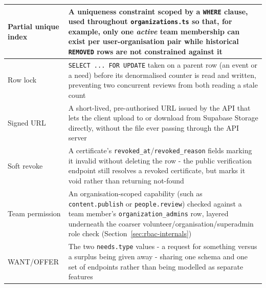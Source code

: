 \begin{longtable}{|p{}|>{\raggedright\arraybackslash}p{}|}
Partial unique index & A uniqueness constraint scoped by a \texttt{WHERE} clause, used throughout \texttt{organizations.ts} so that, for example, only one \emph{active} team membership can exist per user-organisation pair while historical \texttt{REMOVED} rows are not constrained against it\\\hline
Row lock & \texttt{SELECT ... FOR UPDATE} taken on a parent row (an event or a need) before its denormalised counter is read and written, preventing two concurrent reviews from both reading a stale count\\\hline
Signed URL & A short-lived, pre-authorised URL issued by the API that lets the client upload to or download from Supabase Storage directly, without the file ever passing through the API server\\\hline
Soft revoke & A certificate's \texttt{revoked\_at}/\texttt{revoked\_reason} fields marking it invalid without deleting the row - the public verification endpoint still resolves a revoked certificate, but marks it void rather than returning not-found\\\hline
Team permission & An organisation-scoped capability (such as \texttt{content.publish} or \texttt{people.review}) checked against a team member's \texttt{organization\_admins} row, layered underneath the coarser volunteer/organisation/superadmin role check (Section~\ref{sec:rbac-internals})\\\hline
WANT/OFFER & The two \texttt{needs.type} values - a request for something versus a surplus being given away - sharing one schema and one set of endpoints rather than being modelled as separate features\\\hline
\end{longtable}

